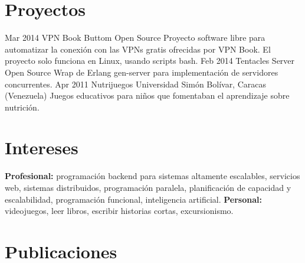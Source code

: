 \documentclass[]{friggeri-cv} %
\begin{document}

\section{Proyectos}

\begin{entrylist}
\entry
{Mar 2014}
{VPN Book Buttom}
{Open Source}
{Proyecto software libre para automatizar la conexión con las VPNs gratis
ofrecidas por VPN Book. El proyecto solo funciona en Linux, usando scripts bash.}
\entry
{Feb 2014}
{Tentacles Server}
{Open Source}
{Wrap de Erlang gen-server para implementación de servidores concurrentes.}
\entry
{Apr 2011}
{Nutrijuegos}
{Universidad Simón Bolívar, Caracas (Venezuela)}
{Juegos educativos para niños que fomentaban el aprendizaje sobre nutrición.}
\end{entrylist}

\newpage
\section{Intereses}

\textbf{Profesional:} programación backend para sistemas altamente escalables,
servicios web, sistemas distribuidos, programación paralela, planificación de
capacidad y escalabilidad, programación funcional, inteligencia artificial.
\textbf{Personal:} videojuegos, leer libros, escribir historias cortas,
excursionismo.


\section{Publicaciones}



\begin{refsection} %
\nocite{*}
\printbibliography[sorting=chronological, type=inproceedings, title={Conferencias internacionales}, notkeyword={france}, heading=subbibliography]
\end{refsection}
\end{document}
